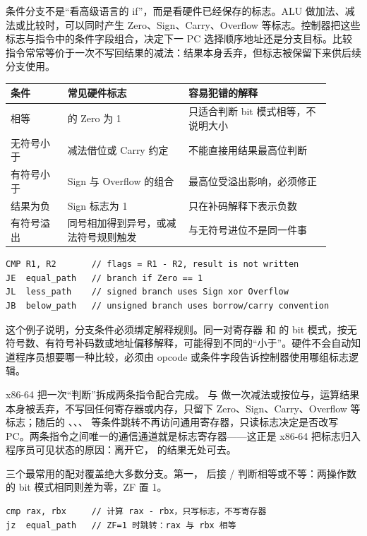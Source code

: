 条件分支不是“看高级语言的 if”，而是看硬件已经保存的标志。ALU 做加法、减法或比较时，可以同时产生 Zero、Sign、Carry、Overflow 等标志。控制器把这些标志与指令中的条件字段组合，决定下一 PC 选择顺序地址还是分支目标。比较指令常常等价于一次不写回结果的减法：结果本身丢弃，但标志被保留下来供后续分支使用。

\begin{longtable}{L{0.16\linewidth}L{0.34\linewidth}L{0.4\linewidth}}
\toprule
条件 & 常见硬件标志 & 容易犯错的解释 \\
\midrule
相等 &  的 Zero 为 1 & 只适合判断 bit 模式相等，不说明大小 \\
无符号小于 & 减法借位或 Carry 约定 & 不能直接用结果最高位判断 \\
有符号小于 & Sign 与 Overflow 的组合 & 最高位受溢出影响，必须修正 \\
结果为负 & Sign 标志为 1 & 只在补码解释下表示负数 \\
有符号溢出 & 同号相加得到异号，或减法符号规则触发 & 与无符号进位不是同一件事 \\
\bottomrule
\end{longtable}

\begin{lstlisting}
CMP R1, R2       // flags = R1 - R2, result is not written
JE  equal_path   // branch if Zero == 1
JL  less_path    // signed branch uses Sign xor Overflow
JB  below_path   // unsigned branch uses borrow/carry convention
\end{lstlisting}

这个例子说明，分支条件必须绑定解释规则。同一对寄存器  和  的 bit 模式，按无符号数、有符号补码数或地址偏移解释，可能得到不同的“小于”。硬件不会自动知道程序员想要哪一种比较，必须由 opcode 或条件字段告诉控制器使用哪组标志逻辑。

x86-64 把一次“判断”拆成两条指令配合完成。 与  做一次减法或按位与，运算结果本身被丢弃，不写回任何寄存器或内存，只留下 Zero、Sign、Carry、Overflow 等标志；随后的 、、、 等条件跳转不再访问通用寄存器，只读标志决定是否改写 PC。两条指令之间唯一的通信通道就是标志寄存器——这正是 x86-64 把标志归入程序员可见状态的原因：离开它， 的结果无处可去。

三个最常用的配对覆盖绝大多数分支。第一， 后接 / 判断相等或不等：两操作数的 bit 模式相同则差为零，ZF 置 1。

\begin{lstlisting}
cmp rax, rbx     // 计算 rax - rbx，只写标志，不写寄存器
jz  equal_path   // ZF=1 时跳转：rax 与 rbx 相等
\end{lstlisting}

